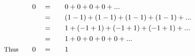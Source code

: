 \begin{alignat*}{5}
&\,&0\quad&=\quad&&0+0+0+0+...\\
&\,&\,&=&&(1-1)+(1-1)+(1-1)+(1-1)+...\\
&\,&\,&=&&1+(-1+1)+(-1+1)+(-1+1)+...\\
&\,&\,&=&&1+0+0+0+0+...\\
&\small\text{Thus}\quad&0\quad&=&&1
\end{alignat*}

